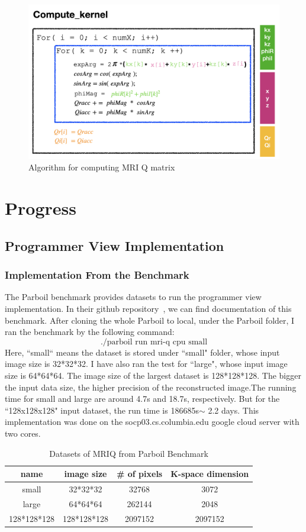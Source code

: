 \documentclass{sig-alternate}
\begin{document}
\begin{figure}[t]
\centering
\captionsetup{justification=centering, format=hang}
\includegraphics[width=0.85\columnwidth]{figure/algorithm.png}
\caption{Algorithm for computing MRI Q matrix~\cite{stone2008accelerating}}
\label{fig-1}
\end{figure}



\section{Progress}

\subsection{Programmer View Implementation}
\subsubsection{Implementation From the Benchmark}
The Parboil benchmark provides datasets to run the programmer view implementation. In their github repository~\cite{Rub1}, we can find documentation of this benchmark. After cloning the whole Parboil to local, under the Parboil folder, I ran the benchmark by the following command:
$$\text{./parboil run mri-q cpu small}$$
Here, ``small“ means the dataset is stored under ``small" folder, whose input image size is 32*32*32. I have also ran the test for ``large", whose input image size is 64*64*64. The image size of the largest dataset is 128*128*128.  The bigger the input data size, the higher precision of the reconstructed image.The running time for small and large are around 4.7s and 18.7s, respectively. But for the ``128x128x128" input dataset, the run time is 186685s$ \sim$ 2.2 days. This implementation was done on the socp03.cs.columbia.edu google cloud server with two cores.
\begin{table}[]
    \centering
    \begin{tabular}{c|c|c|c}
    \hline
    \hline
       name  & image size & \# of pixels & K-space dimension  \\
        \hline
    \hline
        small  & 32*32*32 & 32768 & 3072 \\
        large & 64*64*64 & 262144 & 2048\\
        128*128*128 & 128*128*128 & 2097152 & 2097152\\
        \hline
        \hline
    \end{tabular}
    \caption{Datasets of MRIQ from Parboil Benchmark}
    \label{tab-1}
\end{table}
\end{document}
